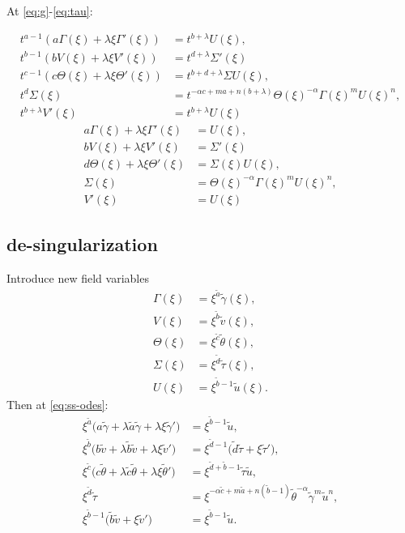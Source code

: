 \documentclass[a4paper,11pt]{article}
\def\tg{{\tilde{\gamma}}}
\def\tv{{\tilde{v}}}
\def\tth{{\tilde{\theta}}}
\def\ts{{\tilde{\tau}}}
\def\tu{{\tilde{u}}}
\def\ta{{\tilde{a}}}
\def\tb{{\tilde{b}}}
\def\tc{{\tilde{c}}}
\def\td{{\tilde{d}}}
\begin{document}
At \eqref{eq:g}-\eqref{eq:tau}:

\begin{align*}
 t^{a-1}(a \Gamma(\xi) + \lambda \xi \Gamma'(\xi)) &= t^{b+ \lambda} U(\xi),\\
 t^{b-1}(b V(\xi) + \lambda \xi V'(\xi)) &= t^{d+ \lambda} \Sigma'(\xi)\\
 t^{c-1}(c \Theta(\xi) + \lambda \xi \Theta'(\xi))&=t^{b+d+\lambda} \Sigma U(\xi),\\
 t^d\Sigma(\xi) &= t^{-\alpha c +ma +n(b+ \lambda)} \Theta(\xi)^{-\alpha} \Gamma(\xi)^m U(\xi)^n,\\
 t^{b+\lambda}V'(\xi)&=t^{b+\lambda}U(\xi)
\end{align*}
\begin{equation}
\begin{aligned}
 a \Gamma(\xi) + \lambda \xi \Gamma'(\xi) &= U(\xi),\\
 b V(\xi) + \lambda \xi V'(\xi) &= \Sigma'(\xi)\\
 d \Theta(\xi) + \lambda \xi \Theta'(\xi)&=\Sigma(\xi) U(\xi),\\
 \Sigma(\xi) &= \Theta(\xi)^{-\alpha} \Gamma(\xi)^m U(\xi)^n,\\
 V'(\xi)&=U(\xi)
\end{aligned} \label{eq:ss-odes}
\end{equation}
\subsection{de-singularization}
Introduce new field variables 
\begin{equation}
\begin{aligned}
 \Gamma(\xi) &= \xi^\ta \tg(\xi),\\
 V(\xi)&=\xi^\tb \tv(\xi),\\
 \Theta(\xi)&=\xi^\tc \tth(\xi),\\
 \Sigma(\xi)&=\xi^\td \ts(\xi),\\
 U(\xi)&=\xi^{\tb-1} \tu(\xi). 
\end{aligned}
\end{equation}
Then at \eqref{eq:ss-odes}:
\begin{align*}
 \xi^\ta\Big( a\tg + \lambda \ta \tg + \lambda\xi\tg'\Big) &=\xi^{\tb-1} \tu,\\
 \xi^\tb\Big( b\tv + \lambda \tb \tv + \lambda\xi\tv'\Big) &=\xi^{\td-1} \Big(\td\ts + \xi\ts'\Big),\\
 \xi^\tc\Big( c\tth+ \lambda \tc \tth+ \lambda\xi\tth'\Big)&=\xi^{\td+\tb-1} \ts\tu,\\
 \xi^\td\ts &= \xi^{-\alpha \tc +m\ta +n(\tb-1)} \tth^{-\alpha} \tg^m \tu^n,\\
 \xi^{\tb-1}\Big(\tb\tv + \xi \tv'\Big)&= \xi^{\tb-1} \tu.
\end{align*}
\end{document}
